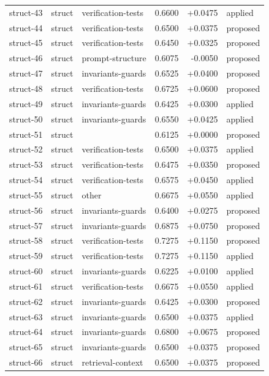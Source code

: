 \begin{center}
\begin{longtable}{llp{5.2cm}rrl}
struct-43 & struct & verification-tests & 0.6600 & +0.0475 & applied \\
struct-44 & struct & verification-tests & 0.6500 & +0.0375 & proposed \\
struct-45 & struct & verification-tests & 0.6450 & +0.0325 & proposed \\
struct-46 & struct & prompt-structure & 0.6075 & -0.0050 & proposed \\
struct-47 & struct & invariants-guards & 0.6525 & +0.0400 & proposed \\
struct-48 & struct & verification-tests & 0.6725 & +0.0600 & proposed \\
struct-49 & struct & invariants-guards & 0.6425 & +0.0300 & applied \\
struct-50 & struct & invariants-guards & 0.6550 & +0.0425 & applied \\
struct-51 & struct &  & 0.6125 & +0.0000 & proposed \\
struct-52 & struct & verification-tests & 0.6500 & +0.0375 & applied \\
struct-53 & struct & verification-tests & 0.6475 & +0.0350 & proposed \\
struct-54 & struct & verification-tests & 0.6575 & +0.0450 & applied \\
struct-55 & struct & other & 0.6675 & +0.0550 & applied \\
struct-56 & struct & invariants-guards & 0.6400 & +0.0275 & proposed \\
struct-57 & struct & invariants-guards & 0.6875 & +0.0750 & proposed \\
struct-58 & struct & verification-tests & 0.7275 & +0.1150 & proposed \\
struct-59 & struct & verification-tests & 0.7275 & +0.1150 & applied \\
struct-60 & struct & invariants-guards & 0.6225 & +0.0100 & applied \\
struct-61 & struct & verification-tests & 0.6675 & +0.0550 & applied \\
struct-62 & struct & invariants-guards & 0.6425 & +0.0300 & proposed \\
struct-63 & struct & invariants-guards & 0.6500 & +0.0375 & applied \\
struct-64 & struct & invariants-guards & 0.6800 & +0.0675 & proposed \\
struct-65 & struct & invariants-guards & 0.6500 & +0.0375 & proposed \\
struct-66 & struct & retrieval-context & 0.6500 & +0.0375 & proposed \\

\end{longtable}
\end{center}
